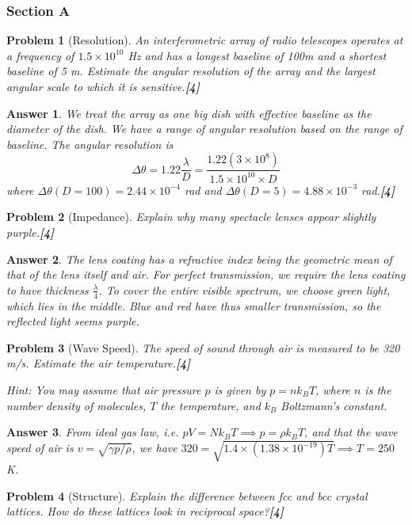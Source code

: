 \documentclass[a4paper]{article}
\newtheorem{ans}{Answer}[subsection]
\theoremstyle{new}
\newtheorem{qns}{Problem}[subsection]
\begin{document}
\subsubsection{Section A}
\begin{qns}[Resolution]
An interferometric array of radio telescopes operates at a frequency of $1.5\times10^{10}$ Hz and has a longest baseline of 100m and a shortest baseline of 5 m. Estimate the angular resolution of the array and the largest angular scale to which it is sensitive.\hfill\textbf{[4]}
\end{qns}
\begin{ans}
We treat the array as one big dish with effective baseline as the diameter of the dish. We have a range of angular resolution based on the range of baseline. The angular resolution is
$$\Delta\theta=1.22\frac{\lambda}{D}=\frac{1.22(3\times10^8)}{1.5\times10^{10}\times D}$$
where $\Delta\theta(D=100)=2.44\times10^{-4}$ rad and $\Delta\theta(D=5)=4.88\times 10^{-3}$ rad.\hfill\textbf{[4]}
\end{ans}
\begin{qns}[Impedance]
Explain why many spectacle lenses appear slightly purple.\hfill\textbf{[4]}
\end{qns}
\begin{ans}
The lens coating has a refractive index being the geometric mean of that of the lens itself and air. For perfect transmission, we require the lens coating to have thickness $\frac{\lambda}{4}$. To cover the entire visible spectrum, we choose green light, which lies in the middle. Blue and red have thus smaller transmission, so the reflected light seems purple.
\end{ans}
\begin{qns}[Wave Speed]
The speed of sound through air is measured to be 320 m/s. Estimate the air temperature.\hfill\textbf{[4]}
\begin{mdframed}
Hint: You may assume that air pressure $p$ is given by $p=nk_BT$, where $n$ is the number density of molecules, $T$ the temperature, and $k_B$ Boltzmann’s constant.
\end{mdframed}
\end{qns}
\begin{ans}
From ideal gas law, i.e. $pV=Nk_BT\implies p=\rho k_BT$, and that the wave speed of air is $v=\sqrt{\gamma p/\rho}$, we have $320=\sqrt{1.4\times(1.38\times10^{-19})T}\implies T=250$ K.
\end{ans}
\begin{qns}[Structure]
Explain the difference between fcc and bcc crystal lattices. How do these lattices look in reciprocal space?\hfill\textbf{[4]}
\end{qns}
\end{document}
